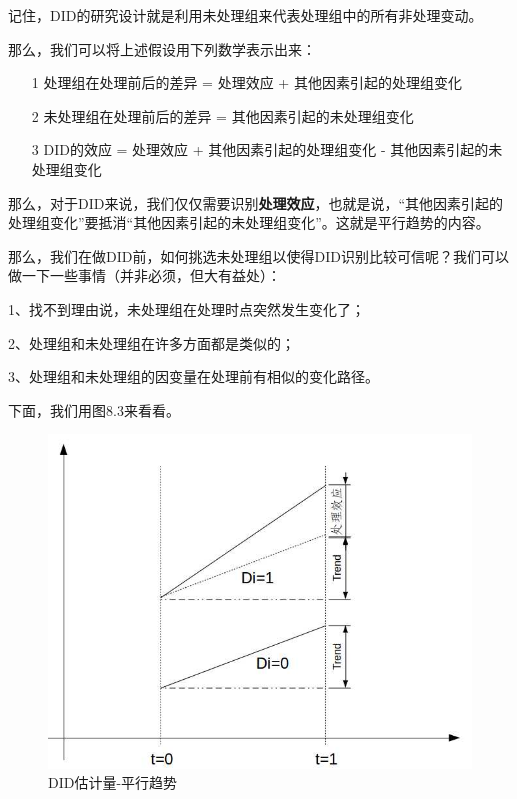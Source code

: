 \documentclass[cn,12pt,math=newtx,citestyle=gb7714-2015,bibstyle=gb7714-2015]{elegantbook}
\begin{document}
	记住，DID的研究设计就是利用未处理组来代表处理组中的所有非处理变动。
	
	那么，我们可以将上述假设用下列数学表示出来：
	
	\begin{itemize}
		\item [1] 处理组在处理前后的差异 = 处理效应 + 其他因素引起的处理组变化
		\item [2] 未处理组在处理前后的差异 = 其他因素引起的未处理组变化
		\item [3] DID的效应 = 处理效应 + 其他因素引起的处理组变化 - 其他因素引起的未处理组变化
	\end{itemize}
	
	那么，对于DID来说，我们仅仅需要识别\textbf{处理效应}，也就是说，“其他因素引起的处理组变化”要抵消“其他因素引起的未处理组变化”。这就是平行趋势的内容。
	
	那么，我们在做DID前，如何挑选未处理组以使得DID识别比较可信呢？我们可以做一下一些事情（并非必须，但大有益处）：
	
	1、找不到理由说，未处理组在处理时点突然发生变化了；
	
	2、处理组和未处理组在许多方面都是类似的；
	
	3、处理组和未处理组的因变量在处理前有相似的变化路径。
	
	
	下面，我们用图8.3来看看。
	\begin{figure}[htbp]
		\centering
		\includegraphics[width=1\textwidth]{commontrend.jpg}
		\caption{DID估计量-平行趋势}\label{fig:digit}
	\end{figure}
	
\end{document}
